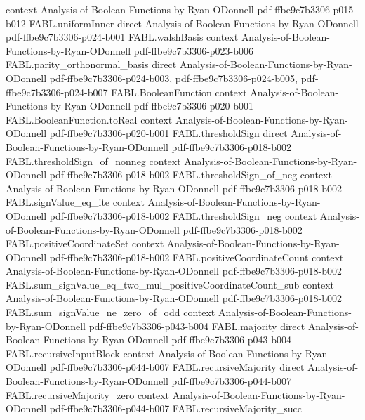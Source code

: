 \begin{theorem}
  {context}
  {Analysis-of-Boolean-Functions-by-Ryan-ODonnell}
  {pdf-ffbe9c7b3306-p015-b012}
\proofstep
  {FABL.uniformInner}
  {direct}
  {Analysis-of-Boolean-Functions-by-Ryan-ODonnell}
  {pdf-ffbe9c7b3306-p024-b001}
\proofstep
  {FABL.walshBasis}
  {context}
  {Analysis-of-Boolean-Functions-by-Ryan-ODonnell}
  {pdf-ffbe9c7b3306-p023-b006}
\proofstep
  {FABL.parity_orthonormal_basis}
  {direct}
  {Analysis-of-Boolean-Functions-by-Ryan-ODonnell}
  {pdf-ffbe9c7b3306-p024-b003,
    pdf-ffbe9c7b3306-p024-b005,
    pdf-ffbe9c7b3306-p024-b007}
\proofstep
  {FABL.BooleanFunction}
  {context}
  {Analysis-of-Boolean-Functions-by-Ryan-ODonnell}
  {pdf-ffbe9c7b3306-p020-b001}
\proofstep
  {FABL.BooleanFunction.toReal}
  {context}
  {Analysis-of-Boolean-Functions-by-Ryan-ODonnell}
  {pdf-ffbe9c7b3306-p020-b001}
\proofstep
  {FABL.thresholdSign}
  {direct}
  {Analysis-of-Boolean-Functions-by-Ryan-ODonnell}
  {pdf-ffbe9c7b3306-p018-b002}
\proofstep
  {FABL.thresholdSign_of_nonneg}
  {context}
  {Analysis-of-Boolean-Functions-by-Ryan-ODonnell}
  {pdf-ffbe9c7b3306-p018-b002}
\proofstep
  {FABL.thresholdSign_of_neg}
  {context}
  {Analysis-of-Boolean-Functions-by-Ryan-ODonnell}
  {pdf-ffbe9c7b3306-p018-b002}
\proofstep
  {FABL.signValue_eq_ite}
  {context}
  {Analysis-of-Boolean-Functions-by-Ryan-ODonnell}
  {pdf-ffbe9c7b3306-p018-b002}
\proofstep
  {FABL.thresholdSign_neg}
  {context}
  {Analysis-of-Boolean-Functions-by-Ryan-ODonnell}
  {pdf-ffbe9c7b3306-p018-b002}
\proofstep
  {FABL.positiveCoordinateSet}
  {context}
  {Analysis-of-Boolean-Functions-by-Ryan-ODonnell}
  {pdf-ffbe9c7b3306-p018-b002}
\proofstep
  {FABL.positiveCoordinateCount}
  {context}
  {Analysis-of-Boolean-Functions-by-Ryan-ODonnell}
  {pdf-ffbe9c7b3306-p018-b002}
\proofstep
  {FABL.sum_signValue_eq_two_mul_positiveCoordinateCount_sub}
  {context}
  {Analysis-of-Boolean-Functions-by-Ryan-ODonnell}
  {pdf-ffbe9c7b3306-p018-b002}
\proofstep
  {FABL.sum_signValue_ne_zero_of_odd}
  {context}
  {Analysis-of-Boolean-Functions-by-Ryan-ODonnell}
  {pdf-ffbe9c7b3306-p043-b004}
\proofstep
  {FABL.majority}
  {direct}
  {Analysis-of-Boolean-Functions-by-Ryan-ODonnell}
  {pdf-ffbe9c7b3306-p043-b004}
\proofstep
  {FABL.recursiveInputBlock}
  {context}
  {Analysis-of-Boolean-Functions-by-Ryan-ODonnell}
  {pdf-ffbe9c7b3306-p044-b007}
\proofstep
  {FABL.recursiveMajority}
  {direct}
  {Analysis-of-Boolean-Functions-by-Ryan-ODonnell}
  {pdf-ffbe9c7b3306-p044-b007}
\proofstep
  {FABL.recursiveMajority_zero}
  {context}
  {Analysis-of-Boolean-Functions-by-Ryan-ODonnell}
  {pdf-ffbe9c7b3306-p044-b007}
\proofstep
  {FABL.recursiveMajority_succ}

\end{theorem}
